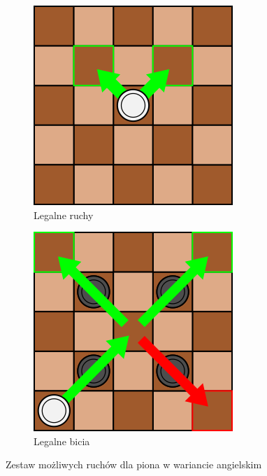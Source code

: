 
\begin{figure}
\centering
\begin{subfigure}{.5\textwidth}
  \centering
  \includegraphics[scale=.6]{graphics/warcaby_ruchyPionZwykle3.png}
  \caption{Legalne ruchy}
  \label{fig:sub1}
\end{subfigure}%
\begin{subfigure}{.5\textwidth}
  \centering
  \includegraphics[scale=.6]{graphics/warcaby_ruchyPionBicia.png}
  \caption{Legalne bicia}
  \label{fig:sub2}
\end{subfigure}
\caption{Zestaw możliwych ruchów dla piona w wariancie angielskim}
\label{fig:test}
\end{figure}

